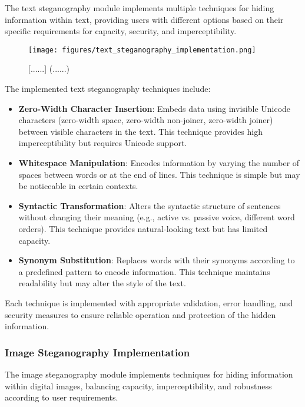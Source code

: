 \documentclass[12pt, a4paper, oneside]{book}
\begin{document}
The text steganography module implements multiple techniques for hiding information within text, providing users with different options based on their specific requirements for capacity, security, and imperceptibility.

\begin{figure}[htbp]
    \centering
    \texttt{[image: figures/text\_steganography\_implementation.png]}
    \caption{[......] (......)}
    \label{fig:text_steg_implementation}
\end{figure}

The implemented text steganography techniques include:

\begin{itemize}[leftmargin=*]
    \item \textbf{Zero-Width Character Insertion}: Embeds data using invisible Unicode characters (zero-width space, zero-width non-joiner, zero-width joiner) between visible characters in the text. This technique provides high imperceptibility but requires Unicode support.

    \item \textbf{Whitespace Manipulation}: Encodes information by varying the number of spaces between words or at the end of lines. This technique is simple but may be noticeable in certain contexts.

    \item \textbf{Syntactic Transformation}: Alters the syntactic structure of sentences without changing their meaning (e.g., active vs. passive voice, different word orders). This technique provides natural-looking text but has limited capacity.

    \item \textbf{Synonym Substitution}: Replaces words with their synonyms according to a predefined pattern to encode information. This technique maintains readability but may alter the style of the text.
\end{itemize}

Each technique is implemented with appropriate validation, error handling, and security measures to ensure reliable operation and protection of the hidden information.

\subsubsection{Image Steganography Implementation}

The image steganography module implements techniques for hiding information within digital images, balancing capacity, imperceptibility, and robustness according to user requirements.
\end{document}
